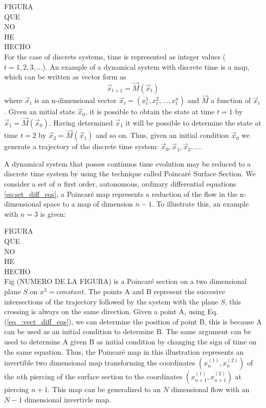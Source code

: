 FIGURA\\
QUE\\
NO\\
HE\\
HECHO\\

For the case of discrete systems, time is represented as integer values ($t=1,2,3,...$). An example of a dynamical system with discrete time is a map, which can be written as vector form as
\begin{equation}
\vec{x}_{t+1}=\vec{M}(\vec{x}_t)
\label{eq:discrete_dyn_sys}
\end{equation}
where $\vec{x}_t$ is an n-dimensional vector $\vec{x}_t=(x^{1}_t,x^{2}_t,...,x^{n}_t)$ and $\vec{M}$ a function of $\vec{x}_t$. Given an initial state $\vec{x}_0$, it is possible to obtain the state at time $t=1$ by $\vec{x}_{1}=\vec{M}(\vec{x}_0)$. Having determined $\vec{x}_1$ it will be possible to determine the state at time $t=2$ by $\vec{x}_2=\vec{M}(\vec{x}_1)$ and so on. Thus, given an initial condition $\vec{x}_0$ we generate a trajectory of the discrete time system: $\vec{x}_0,\vec{x}_1,\vec{x}_2,...$. 

A dynamical system that posses continuos time evolution may be reduced to a discrete time system by using the technique called Poincaré Surface Section. We consider a set of $n$ first order, autonomous, ordinary differential equations \ref{eq:set_diff_eqs}, a Poincaré map represents a reduction of the flow in the n-dimensional space to a map of dimension $n-1$. To illustrate this, an example with $n=3$ is given:

FIGURA\\
QUE\\
NO\\
HE\\
HECHO\\

Fig (NUMERO DE LA FIGURA) is a Poincaré section on a two dimensional plane $S$ on $x^{3}=constant$. The points A and B represent the succesive intersections of the trajectory followed by the system with the plane $S$, this crossing is always on the same direction. Given a point A, using Eq. (\ref{eq_:vect_diff_eqs}), we can determine the position of point B, this is because A can be used as an initial condition to determine B. The same argument can be used to determine A given B as initial condition by changing the sign of time on the same equation. Thus, the Poincar\'e map in this illustration represents an invertible two dimensional map transforming the coordinates $(x_n^{(1)},x_n^{(2)})$ of the $n$th piercing of the surface section to the coordinates $(x_{n+1}^{(1)},x_{n+1}^{(2)})$ at piercing $n+1$. This map can be generalized to an $N$ dimensional flow with an $N-1$ dimensional invertivle map.


